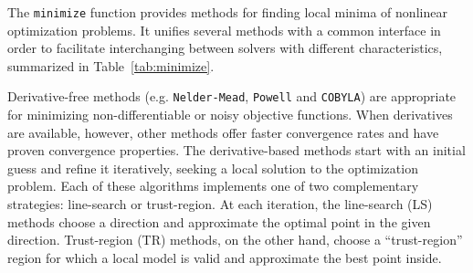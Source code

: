 The \texttt{minimize} function provides methods for finding local minima of nonlinear optimization
problems. It unifies several methods with a common interface in order to facilitate
interchanging between solvers with different characteristics, summarized in Table~\ref{tab:minimize}.

Derivative-free methods (e.g. \texttt{Nelder-Mead}, \texttt{Powell} and \texttt{COBYLA}) are appropriate for minimizing non-differentiable or
noisy objective functions. When derivatives are available, however, other methods offer faster convergence rates
and have proven convergence properties. 
The derivative-based methods start with an initial guess and refine it iteratively, seeking
a local solution to the optimization problem. Each of these algorithms implements one of two complementary strategies:
line-search or trust-region. At each iteration, the line-search (LS) methods choose a direction
and approximate the optimal point in the given direction. Trust-region (TR) methods, on the other
hand, choose a ``trust-region'' region for which a local model is valid and approximate the best point
inside.

